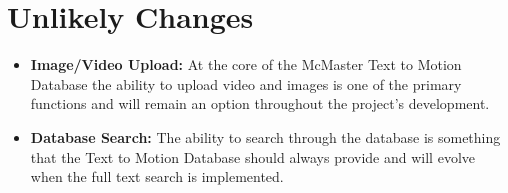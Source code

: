 \documentclass{scrreprt}
\begin{document}
\section{Unlikely Changes}

\begin{itemize}
    \item \textbf {Image/Video Upload:} At the core of the McMaster Text to
            Motion Database the ability to upload video and images is one of
                  the primary functions and will remain an option throughout
                  the project's development.

    \item \textbf {Database Search:} The ability to search through the database
            is something that the Text to Motion Database should always provide
                  and will evolve when the full text search is implemented.
\end{itemize}
\end{document}
